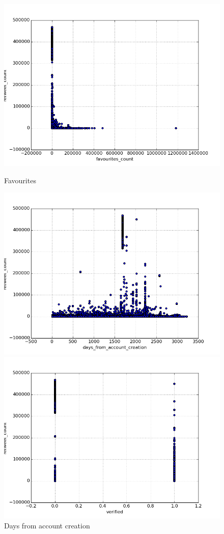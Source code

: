 \begin{figure}[H]
    \centering
    \includegraphics[width=\linewidth]{img/favourites_count.png}
    \caption{Favourites}
\endminipage\hfill
{}
    \centering
    \includegraphics[width=\linewidth]{img/days_from_account_creation.png}
    \caption{Days from account creation}
\endminipage\hfill
{}
    \centering
    \includegraphics[width=\linewidth]{img/verified.png}

\end{figure}
